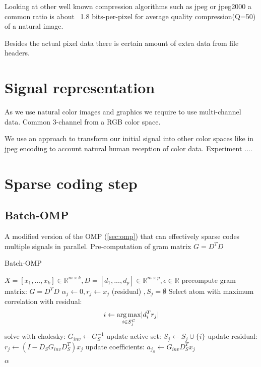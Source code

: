 Looking at other well known compression algorithms such as jpeg or jpeg2000 a common ratio is about ~1.8 bits-per-pixel for average quality compression(Q=50) of a natural image. 

Besides the actual pixel data there is certain amount of extra data from file headers. 


\section{Signal representation}
As we use natural color images and graphics we require to use multi-channel data. Common 3-channel from a RGB color space.

We use an approach to transform our initial signal into other color spaces like in jpeg encoding to account natural human reception of
color data. 
Experiment ....


\section{Sparse coding step}
\subsection{Batch-OMP}
A modified version of the OMP (\ref{sec:omp}) that can effectively sparse codes multiple signals in parallel.
Pre-computation of gram matrix $G=D^TD$
\cite{Rubinstein2008}

\begin{algorithm}
\caption{Batch-OMP}
\begin{algorithmic}[1]
\REQUIRE $X =[x_1,...,x_k]  \in \mathbb{R}^{m \times k}, D  =[d_1,...,d_p]  \in \mathbb{R}^{m\times p}, \epsilon \in \mathbb{R}$
\STATE precompute gram matrix: $G=D^TD$
\STATE $\alpha_j \gets 0, r_j \gets x_j $ (residual) $, S_j=\emptyset$
\STATE Select atom with maximum correlation with residual: 
\begin{equation*}
i \gets \operatorname*{arg\,max}_{i \in S_j^C} \lvert d_i^Tr_j \rvert
\end{equation*}
\STATE solve with cholesky: $G_{inv} \gets G_S^{-1}$
\STATE update active set: $S_j \gets S_j \cup \{i\} $
\STATE update residual: $r_j \gets \left(I-D_SG_{inv}D_S^T \right)x_j$
\STATE update coefficients: $a_{j_S} \gets G_{inv} D_S^T x_j $

\ENDFOR 
\ENDFOR 

\RETURN $\alpha$
\end{algorithmic}
\end{algorithm}

